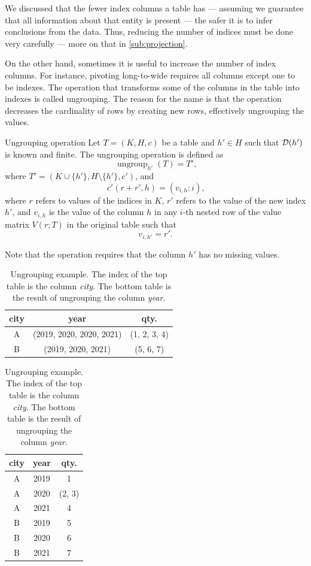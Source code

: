 We discussed that the fewer index columns a table has ---
assuming we guarantee that all information about that entity is present --- the safer
it is to infer conclusions from the data.  Thus, reducing the number of indices
must be done very carefully --- more on that in \cref{sub:projection}.

On the other hand, sometimes it is useful to increase the number of index columns.  For
instance, pivoting long-to-wide requires all columns except one to be indexes.  The
operation that transforms some of the columns in the table into indexes is called ungrouping.
The reason for the name is that the operation decreases the cardinality of rows
by creating new rows, effectively ungrouping the values.

\begin{definition}{Ungrouping operation}\label{def:grouping}
  Let $T = (K, H, c)$ be a table and $h' \in H$ such that $\mathcal{D}\!\left(h'\right)$ is known and
  finite.  The ungrouping operation is defined as \[
    \operatorname{ungroup}_{h'}(T) = T'\text{,}
  \] where $T' = (K \cup \{h'\}, H \setminus \{h'\}, c')$, and \[
    c'(r + r', h) = (v_{i,h} : i)\text{,}
  \] where $r$ refers to values of the indices in $K$, $r'$ refers to the value of the new index
  $h'$, and $v_{i,h}$ is the value of the column $h$ in any $i$-th nested row of the value
  matrix $V(r; T)$ in the original table such that \[
    v_{i, h'} = r'\text{.}
  \]
\end{definition}

Note that the operation requires that the column $h'$ has no missing values.

\begin{table}
  \centering
  \begin{tabular}{ccc}
    \toprule
    \textbf{city} & \textbf{year} & \textbf{qty.} \\
    \midrule
    A & (2019, 2020, 2020, 2021) & (1, 2, 3, 4) \\
    B & (2019, 2020, 2021) & (5, 6, 7) \\
    \bottomrule
  \end{tabular}

  \vspace{1em}
  \begin{tabular}{ccc}
    \toprule
    \textbf{city} & \textbf{year} & \textbf{qty.} \\
    \midrule
    A & 2019 & 1 \\
    A & 2020 & (2, 3) \\
    A & 2021 & 4 \\
    B & 2019 & 5 \\
    B & 2020 & 6 \\
    B & 2021 & 7 \\
    \bottomrule
  \end{tabular}
  \caption{
  Ungrouping example.
  The index of the top table is the column \emph{city}.  The bottom table is the result of
  ungrouping the column \emph{year}.
  }
  \label{tab:ungroup}
\end{table}

